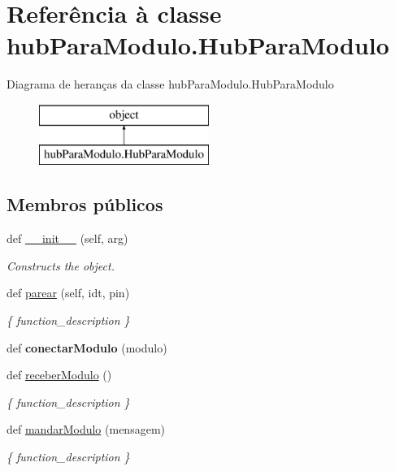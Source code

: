 \hypertarget{classhub_para_modulo_1_1_hub_para_modulo}{}\section{Referência à classe hub\+Para\+Modulo.\+Hub\+Para\+Modulo}
\label{classhub_para_modulo_1_1_hub_para_modulo}
Diagrama de heranças da classe hub\+Para\+Modulo.\+Hub\+Para\+Modulo\begin{figure}[H]
\begin{center}
\leavevmode
\includegraphics[height=2.000000cm]{classhub_para_modulo_1_1_hub_para_modulo}
\end{center}
\end{figure}
\subsection*{Membros públicos}
\begin{DoxyCompactItemize}
\item 
def \hyperlink{classhub_para_modulo_1_1_hub_para_modulo_abf63ddad3857ffe2c53bfa707a149c75}{\+\_\+\+\_\+init\+\_\+\+\_\+} (self, arg)
\begin{DoxyCompactList}\small\item\em Constructs the object. \end{DoxyCompactList}\item 
def \hyperlink{classhub_para_modulo_1_1_hub_para_modulo_a9606d191b7c3ef186a3d9ce851cface7}{parear} (self, idt, pin)
\begin{DoxyCompactList}\small\item\em \{ function\+\_\+description \} \end{DoxyCompactList}\item 
def {\bfseries conectar\+Modulo} (modulo)\hypertarget{classhub_para_modulo_1_1_hub_para_modulo_a900479a98a6654264db5ae768070c57d}{}\label{classhub_para_modulo_1_1_hub_para_modulo_a900479a98a6654264db5ae768070c57d}

\item 
def \hyperlink{classhub_para_modulo_1_1_hub_para_modulo_af13d34db03264f5039697c7ca64c5d48}{receber\+Modulo} ()
\begin{DoxyCompactList}\small\item\em \{ function\+\_\+description \} \end{DoxyCompactList}\item 
def \hyperlink{classhub_para_modulo_1_1_hub_para_modulo_a3b77e329ad83e2a107f0125332d92486}{mandar\+Modulo} (mensagem)
\begin{DoxyCompactList}\small\item\em \{ function\+\_\+description \} \end{DoxyCompactList}\end{DoxyCompactItemize}
